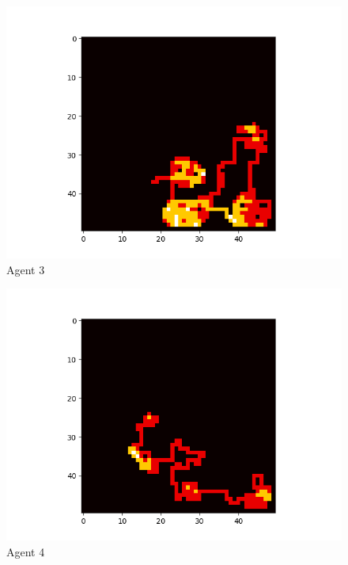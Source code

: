 \begin{figure}[!ht]
	\centering
	\includegraphics[scale=0.70]{images/test1_agent3.png}
	\caption{Agent 3}
	\label{fig:test1Agent3}
\end{figure}

\begin{figure}[!ht]
	\centering
	\includegraphics[scale=0.70]{images/test1_agent4.png}
	\caption{Agent 4}
	\label{fig:test1Agent4}
\end{figure}

